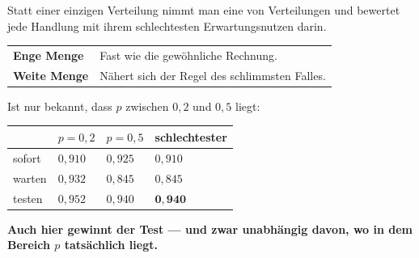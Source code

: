 \begin{merksatz}
Statt einer einzigen Verteilung nimmt man eine  von Verteilungen und bewertet jede Handlung mit ihrem schlechtesten Erwartungsnutzen darin.

\begin{center}
{\small
\renewcommand{\arraystretch}{1.5}
\begin{tabular}{@{}P{2.8cm}P{5.8cm}@{}}
\toprule
\textbf{Enge Menge} & Fast wie die gewöhnliche Rechnung.\\
\textbf{Weite Menge} & Nähert sich der Regel des schlimmsten Falles.\\
\bottomrule
\end{tabular}}
\end{center}

 Ist nur bekannt, dass $p$ zwischen $0{,}2$ und $0{,}5$ liegt:
\begin{center}
{\small
\renewcommand{\arraystretch}{1.48}
\begin{tabular}{@{}P{2.4cm}P{2.2cm}P{2.2cm}P{2.0cm}@{}}
\toprule
& $p = 0{,}2$ & $p = 0{,}5$ & \textbf{schlechtester}\\
\midrule
sofort & $0{,}910$ & $0{,}925$ & $0{,}910$\\
warten & $0{,}932$ & $0{,}845$ & $0{,}845$\\
testen & $0{,}952$ & $0{,}940$ & $\mathbf{0{,}940}$\\
\bottomrule
\end{tabular}}
\end{center}

\begin{center}
\begin{minipage}{0.9\textwidth}
\textbf{Auch hier gewinnt der Test --- und zwar unabhängig davon, wo in dem Bereich $p$ tatsächlich liegt.}
\end{minipage}
\end{center}

\begin{center}
\begin{minipage}{0.88\textwidth}
\end{minipage}
\end{center}
\end{merksatz}

